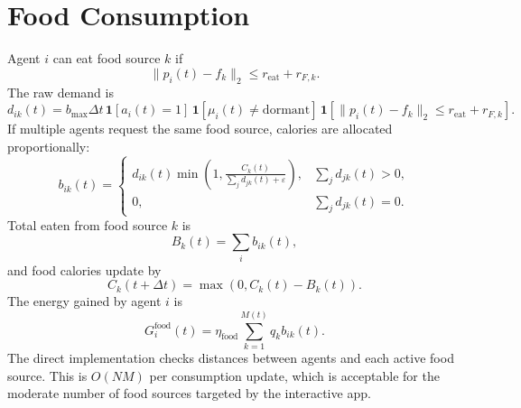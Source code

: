 \documentclass[11pt]{article}
\begin{document}
\section{Food Consumption}
Agent $i$ can eat food source $k$ if
\begin{equation}
  \|p_i(t)-f_k\|_2\le r_{\mathrm{eat}}+r_{F,k}.
\end{equation}
The raw demand is
\begin{equation}
  d_{ik}(t)=b_{\max}\Delta t\,
  \mathbf{1}[a_i(t)=1]\,
  \mathbf{1}[\mu_i(t)\ne\mathrm{dormant}]\,
  \mathbf{1}[\|p_i(t)-f_k\|_2\le r_{\mathrm{eat}}+r_{F,k}].
\end{equation}
If multiple agents request the same food source, calories are allocated
proportionally:
\begin{equation}
  b_{ik}(t)=
  \begin{cases}
  d_{ik}(t)\min\left(1,\frac{C_k(t)}{\sum_j d_{jk}(t)+\varepsilon}\right),
  & \sum_j d_{jk}(t)>0,\\
  0, & \sum_j d_{jk}(t)=0.
  \end{cases}
\end{equation}
Total eaten from food source $k$ is
\begin{equation}
  B_k(t)=\sum_i b_{ik}(t),
\end{equation}
and food calories update by
\begin{equation}
  C_k(t+\Delta t)=\max(0,C_k(t)-B_k(t)).
\end{equation}
The energy gained by agent $i$ is
\begin{equation}
  G_i^{\mathrm{food}}(t)=\eta_{\mathrm{food}}\sum_{k=1}^{M(t)}q_kb_{ik}(t).
\end{equation}
The direct implementation checks distances between agents and each active food
source. This is $O(NM)$ per consumption update, which is acceptable for the
moderate number of food sources targeted by the interactive app.
\end{document}
